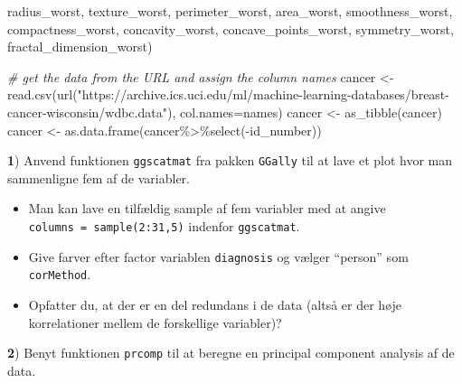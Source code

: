 \documentclass[
]{book}
\newenvironment{Shaded}{\begin{snugshade}}{\end{snugshade}}
\newcommand{\AttributeTok}[1]{\textcolor[rgb]{0.77,0.63,0.00}{#1}}
\newcommand{\CommentTok}[1]{\textcolor[rgb]{0.56,0.35,0.01}{\textit{#1}}}
\newcommand{\FunctionTok}[1]{\textcolor[rgb]{0.00,0.00,0.00}{#1}}
\newcommand{\NormalTok}[1]{#1}
\newcommand{\OtherTok}[1]{\textcolor[rgb]{0.56,0.35,0.01}{#1}}
\newcommand{\SpecialCharTok}[1]{\textcolor[rgb]{0.00,0.00,0.00}{#1}}
\newcommand{\StringTok}[1]{\textcolor[rgb]{0.31,0.60,0.02}{#1}}
\providecommand{\tightlist}{%
  \setlength{\itemsep}{0pt}\setlength{\parskip}{0pt}}
\begin{document}
\begin{Shaded}
\begin{Highlighting}[]
           \StringTok{\textquotesingle{}radius\_worst\textquotesingle{}}\NormalTok{, }\StringTok{\textquotesingle{}texture\_worst\textquotesingle{}}\NormalTok{, }
           \StringTok{\textquotesingle{}perimeter\_worst\textquotesingle{}}\NormalTok{, }\StringTok{\textquotesingle{}area\_worst\textquotesingle{}}\NormalTok{, }
           \StringTok{\textquotesingle{}smoothness\_worst\textquotesingle{}}\NormalTok{, }\StringTok{\textquotesingle{}compactness\_worst\textquotesingle{}}\NormalTok{, }
           \StringTok{\textquotesingle{}concavity\_worst\textquotesingle{}}\NormalTok{, }\StringTok{\textquotesingle{}concave\_points\_worst\textquotesingle{}}\NormalTok{, }
           \StringTok{\textquotesingle{}symmetry\_worst\textquotesingle{}}\NormalTok{, }\StringTok{\textquotesingle{}fractal\_dimension\_worst\textquotesingle{}}\NormalTok{)}
  
\CommentTok{\# get the data from the URL and assign the column names}
\NormalTok{cancer }\OtherTok{\textless{}{-}} \FunctionTok{read.csv}\NormalTok{(}\FunctionTok{url}\NormalTok{(}\StringTok{"https://archive.ics.uci.edu/ml/machine{-}learning{-}databases/breast{-}cancer{-}wisconsin/wdbc.data"}\NormalTok{), }\AttributeTok{col.names=}\NormalTok{names)}
\NormalTok{cancer }\OtherTok{\textless{}{-}} \FunctionTok{as\_tibble}\NormalTok{(cancer)}
\NormalTok{cancer }\OtherTok{\textless{}{-}} \FunctionTok{as.data.frame}\NormalTok{(cancer}\SpecialCharTok{\%\textgreater{}\%}\FunctionTok{select}\NormalTok{(}\SpecialCharTok{{-}}\NormalTok{id\_number))}
\end{Highlighting}
\end{Shaded}

\textbf{1}) Anvend funktionen \texttt{ggscatmat} fra pakken \texttt{GGally} til at lave et plot hvor man sammenligne fem af de variabler.

\begin{itemize}
\tightlist
\item
  Man kan lave en tilfældig sample af fem variabler med at angive \texttt{columns\ =\ sample(2:31,5)} indenfor \texttt{ggscatmat}.
\item
  Give farver efter factor variablen \texttt{diagnosis} og vælger ``person'' som \texttt{corMethod}.
\item
  Opfatter du, at der er en del redundans i de data (altså er der høje korrelationer mellem de forskellige variabler)?
\end{itemize}

\textbf{2}) Benyt funktionen \texttt{prcomp} til at beregne en principal component analysis af de data.
\end{document}
